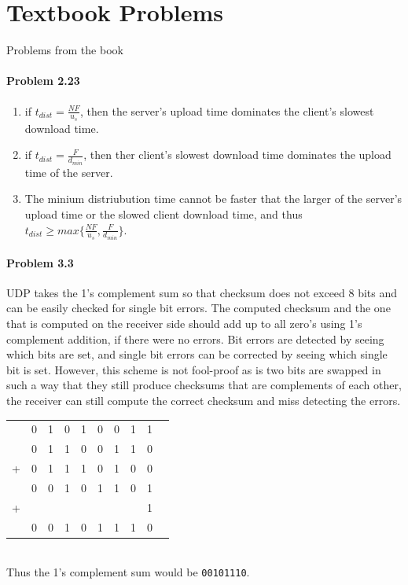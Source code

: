 \documentclass[12pt]{article}
\title{\class{}\assign{}\hwNum{}}
\author{\name{}}
\date{\displaydate{date}}
\begin{document}
\maketitle
\newpage

\section{Textbook Problems}
Problems from the book

\paragraph{Problem 2.23}
\begin{enumerate}[label=\textbf{Part \alph*)},leftmargin=*,align=left]
	\item if $t_{dist} = \frac{NF}{u_s}$, then the server's upload time dominates the client's slowest download time.
	\item if $t_{dist} = \frac{F}{d_{min}}$, then ther client's slowest download time dominates the upload time of the server.
	\item The minium distriubution time cannot be faster that the larger of the server's upload time or the slowed client download time, and thus $t_{dist} \geq max\{ \frac{NF}{ u_s}, \frac{F}{ d_{min}} \}$.
\end{enumerate}

\paragraph{Problem 3.3}
UDP takes the 1's complement sum so that checksum does not exceed 8 bits and can be easily checked for single bit errors. The computed checksum and the one that is computed on the receiver side should add up to all zero's using 1's complement addition, if there were no errors. Bit errors are detected by seeing which bits are set, and single bit errors can be corrected by seeing which single bit is set. However, this scheme is not fool-proof as is two bits are swapped in such a way that they still produce checksums that are complements of each other, the receiver can still compute the correct checksum and miss detecting the errors. \\
\begin{tabular}{ l | l | l | l | l | l | l | l | l | l |}
	    & 0&1&0&1&0&0&1&1 \\
	    & 0&1&1&0&0&1&1&0 \\
	+ & 0&1&1&1&0&1&0&0 \\
	\hline
	& 0&0&1&0&1&1&0&1\\
	+ &&&&&&&&1\\
	\hline
	&0&0&1&0&1&1&1&0\\
\end{tabular}
\\
Thus the 1's complement sum would be \texttt{00101110}.
\end{document}
